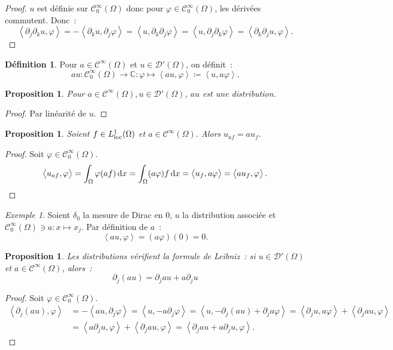 \documentclass{report}
\newcommand{\C}{{\mathbb C}}
\newcommand{\scpr}[2]{\left\langle#1, #2\right\rangle}
\newcommand{\loc}{{\text{\textnormal{loc}}}}
\newtheorem{prp}[thm]{Proposition}
\theoremstyle{definition}
\newtheorem{déf}[thm]{Définition}
\theoremstyle{remark}
\newtheorem{ex}{Exemple}[chapter]
\begin{document}
\begin{proof} $u$ est définie sur $\mathcal C^\infty_0(\Omega)$ donc pour $\varphi \in \mathcal C^\infty_0(\Omega)$, les dérivées commutent. Donc~:
\[\scpr {\partial_j\partial_ku}\varphi = -\scpr {\partial_ku}{\partial_j\varphi} = \scpr u{\partial_k\partial_j\varphi} = \scpr u{\partial_j\partial_k\varphi}
= \scpr {\partial_k\partial_ju}\varphi.\]
\end{proof}

\begin{déf} Pour $a \in \mathcal C^\infty(\Omega)$ et $u \in \mathcal D'(\Omega)$, on définit~:
\[au : \mathcal C^\infty_0(\Omega) \to \C : \varphi \mapsto \scpr {au}\varphi \coloneqq \scpr u{a\varphi}.\]
\end{déf}

\begin{prp} Pour $a \in \mathcal C^\infty(\Omega), u \in \mathcal D'(\Omega)$, $au$ est une distribution.
\end{prp}

\begin{proof} Par linéarité de $u$.
\end{proof}

\begin{prp} Soient $f \in L^1_\loc(\Omega)$ et $a \in \mathcal C^\infty(\Omega)$. Alors $u_{af} = au_f$.
\end{prp}

\begin{proof} Soit $\varphi \in \mathcal C^\infty_0(\Omega)$.
\[\scpr {u_{af}}\varphi = \int_\Omega \varphi (af)\dif x = \int_\Omega(a\varphi)f\dif x = \scpr {u_f}{a\varphi} = \scpr {au_f}\varphi.\]
\end{proof}

\begin{ex} Soient $\delta_0$ la mesure de Dirac en 0, $u$ la distribution associée et $\mathcal C^\infty_0(\Omega) \ni a : x \mapsto x_j$. Par définition de $a$~:
\[\scpr {au}\varphi = (a\varphi)(0) = 0.\]
\end{ex}

\begin{prp} Les distributions vérifient la formule de Leibniz~: si $u \in \mathcal D'(\Omega)$ et $a \in \mathcal C^\infty(\Omega)$, alors~:
\[\partial_j(au) = \partial_jau + a\partial_ju\]
\end{prp}

\begin{proof} Soit $\varphi \in \mathcal C^\infty_0(\Omega)$.
\begin{align*}
	\scpr {\partial_j(au)}\varphi &= -\scpr {au}{\partial_j\varphi} = \scpr u{-a\partial_j\varphi} = \scpr u{-\partial_j(au)+\partial_ja\varphi}
		= \scpr {\partial_ju}{a\varphi} + \scpr{\partial_jau}\varphi \\
	&= \scpr {a\partial_ju}\varphi + \scpr {\partial_jau}\varphi = \scpr {\partial_jau + a\partial_ju}\varphi.
\end{align*}
\end{proof}
\end{document}
